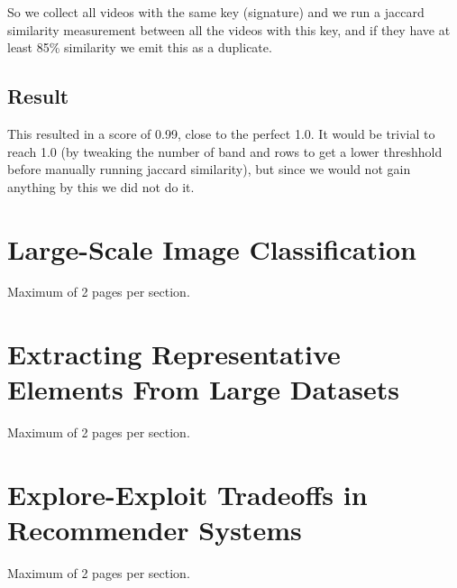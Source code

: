 \documentclass[a4paper, 11pt]{article}
\begin{document}
		So we collect all videos with the same key (signature) and we run a jaccard similarity measurement between all the videos with this key, and if they have at least 85\% similarity we emit this as a duplicate.

	\subsection{Result}
		This resulted in a score of 0.99, close to the perfect 1.0. It would be trivial to reach 1.0  (by tweaking the number of band and rows to get a lower threshhold before manually running jaccard similarity), but since we would not gain anything by this we did not do it. 

\section{Large-Scale Image Classification}
Maximum of 2 pages per section.

\section{Extracting Representative Elements From Large Datasets}
Maximum of 2 pages per section.

\section{Explore-Exploit Tradeoffs in Recommender Systems}
Maximum of 2 pages per section.
\end{document}
